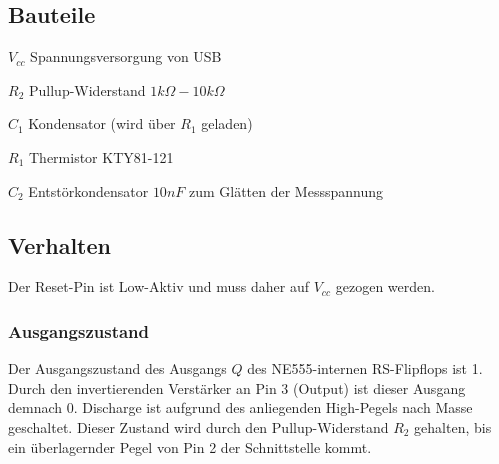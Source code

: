 \documentclass[12pt,titlepage]{article}
\begin{document}
%		
%		
%		
%
%		
%

	\subsection{Bauteile}
		\begin{description*}
			\item[$V_{cc}$] Spannungsversorgung von USB
			\item[$R_{2}$] Pullup-Widerstand $1k\Omega-10k\Omega$
			\item[$C_1$] Kondensator (wird über $R_1$ geladen)
			\item[$R_1$] Thermistor KTY81-121
			\item[$C_2$] Entstörkondensator $10nF$ zum Glätten der Messspannung
		\end{description*}
		
	\subsection{Verhalten}
		Der Reset-Pin ist Low-Aktiv und muss daher auf $V_{cc}$ gezogen werden.
		\subsubsection{Ausgangszustand}
			Der Ausgangszustand des Ausgangs $Q$ des NE555-internen RS-Flipflops ist 1.
			Durch den invertierenden Verstärker an Pin 3 (Output) ist dieser Ausgang demnach 0.
			Discharge ist aufgrund des anliegenden High-Pegels nach Masse geschaltet.
			Dieser Zustand wird durch den Pullup-Widerstand $R_{2}$ gehalten, bis ein überlagernder Pegel von Pin 2 der Schnittstelle kommt.
			
\end{document}
